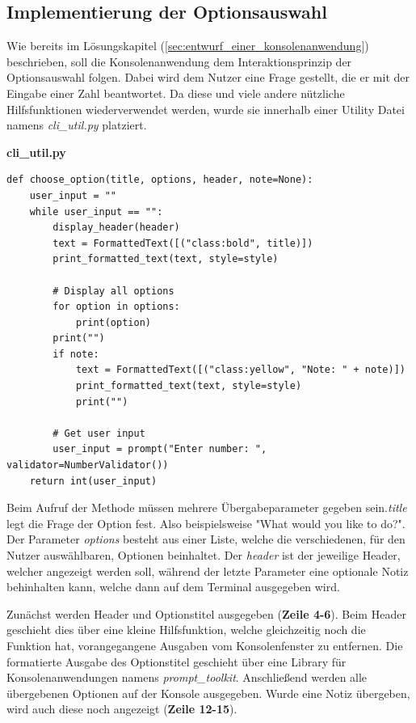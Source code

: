 \documentclass[oneside]{ausarbeitung}
\begin{document}
\subsection{Implementierung der Optionsauswahl}
\label{sub:implementierung_der_optionsauswahl}

Wie bereits im Lösungskapitel (\ref{sec:entwurf_einer_konsolenanwendung}) beschrieben, soll die Konsolenanwendung dem Interaktionsprinzip der Optionsauswahl folgen. Dabei wird dem Nutzer eine Frage gestellt, die er mit der Eingabe einer Zahl beantwortet. Da diese und viele andere nützliche Hilfsfunktionen wiederverwendet werden, wurde sie innerhalb einer Utility Datei namens \textit{cli\_util.py} platziert.

\lstset{language=Python}
\lstset{frame=lines}
\lstset{basicstyle=\footnotesize}
\textbf{cli\_util.py}
\begin{lstlisting}
def choose_option(title, options, header, note=None):
	user_input = ""
	while user_input == "":
		display_header(header)
		text = FormattedText([("class:bold", title)])
		print_formatted_text(text, style=style)

		# Display all options
		for option in options:
			print(option)
		print("")
		if note:
			text = FormattedText([("class:yellow", "Note: " + note)])
			print_formatted_text(text, style=style)
			print("")

		# Get user input
		user_input = prompt("Enter number: ", validator=NumberValidator())
	return int(user_input)
\end{lstlisting}

Beim Aufruf der Methode müssen mehrere Übergabeparameter gegeben sein.\textit{title} legt die Frage der Option fest. Also beispielsweise "What would you like to do?". Der Parameter \textit{options} besteht aus einer Liste, welche die verschiedenen, für den Nutzer auswählbaren, Optionen beinhaltet. Der \textit{header} ist der jeweilige Header, welcher angezeigt werden soll, während der letzte Parameter eine optionale Notiz behinhalten kann, welche dann auf dem Terminal ausgegeben wird.

Zunächst werden Header und Optionstitel ausgegeben (\textbf{Zeile 4-6}). Beim Header geschieht dies über eine kleine Hilfsfunktion, welche gleichzeitig noch die Funktion hat, vorangegangene Ausgaben vom Konsolenfenster zu entfernen. Die formatierte Ausgabe des Optionstitel geschieht über eine Library für Konsolenanwendungen namens \textit{prompt\_toolkit}. Anschließend werden alle übergebenen Optionen auf der Konsole ausgegeben. Wurde eine Notiz übergeben, wird auch diese noch angezeigt (\textbf{Zeile 12-15}).
\end{document}
